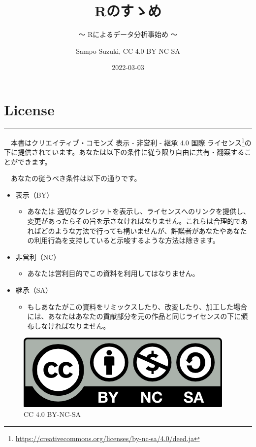 \documentclass[
  12pt,
]{book}
\title{Rのすゝめ}
\subtitle{〜 Rによるデータ分析事始め 〜}
\author{Sampo Suzuki, CC 4.0 BY-NC-SA}
\date{2022-03-03}
\DeclareRobustCommand{\href}[2]{#2\footnote{\url{#1}}}
\providecommand{\tightlist}{%
  \setlength{\itemsep}{0pt}\setlength{\parskip}{0pt}}
\begin{document}
\maketitle

{
\hypersetup{linkcolor=}
\setcounter{tocdepth}{3}
\tableofcontents
}
\listoffigures
\listoftables
{}
\hypertarget{license}{%
\chapter*{License}\label{license}}

\begin{center}\rule{0.5\linewidth}{0.5pt}\end{center}

　本書は\href{https://creativecommons.org/licenses/by-nc-sa/4.0/deed.ja}{クリエイティブ・コモンズ 表示 - 非営利 - 継承 4.0 国際 ライセンス}の下に提供されています。あなたは以下の条件に従う限り自由に共有・翻案することができます。

　あなたの従うべき条件は以下の通りです。

\begin{itemize}
\item
  表示（BY）

  \begin{itemize}
  \tightlist
  \item
    あなたは 適切なクレジットを表示し、ライセンスへのリンクを提供し、変更があったらその旨を示さなければなりません。これらは合理的であればどのような方法で行っても構いませんが、許諾者があなたやあなたの利用行為を支持していると示唆するような方法は除きます。
  \end{itemize}
\item
  非営利（NC）

  \begin{itemize}
  \tightlist
  \item
    あなたは営利目的でこの資料を利用してはなりません。
  \end{itemize}
\item
  継承（SA）

  \begin{itemize}
  \tightlist
  \item
    もしあなたがこの資料をリミックスしたり、改変したり、加工した場合には、あなたはあなたの貢献部分を元の作品と同じライセンスの下に頒布しなければなりません。
  \end{itemize}
\end{itemize}

\begin{figure}
\centering
\includegraphics{"./fig/by-nc-sa.png"}
\caption{CC 4.0 BY-NC-SA}
\end{figure}
\end{document}
